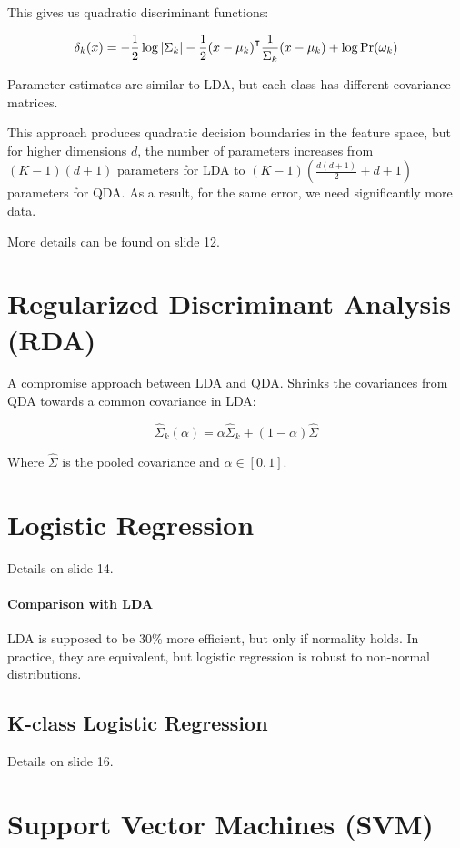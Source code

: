 \documentclass{idc_msc}
\renewcommand{\T}{{\mathpalette\raiseT\intercal}} %
\begin{document}
This gives us quadratic discriminant functions:

\[\delta_k(x) = - \frac{1}{2} \log |\Sigma_k| - \frac{1}{2}(x - \mu_k)^\T \frac{1}{\Sigma_k}(x- \mu_k) + \log \Pr(\omega_k) \]

Parameter estimates are similar to LDA, but each class has different covariance matrices.

This approach produces quadratic decision boundaries in the feature space, but for higher dimensions \(d\), the number of parameters increases from \((K-1)(d+1)\) parameters for LDA to \((K-1)(\frac{d(d+1)}{2}+d + 1)\) parameters for QDA.
As a result, for the same error, we need significantly more data.

More details can be found on slide 12.

\section{Regularized Discriminant Analysis (RDA)}

A compromise approach between LDA and QDA.
Shrinks the covariances from QDA towards a common covariance in LDA:

\[\widehat{\Sigma}_k(\alpha) = \alpha\widehat{\Sigma}_k + (1 - \alpha)\widehat{\Sigma}\]

Where \(\widehat{\Sigma}\) is the pooled covariance and \(\alpha \in [0,1]\).

\section{Logistic Regression}

Details on slide 14.

\paragraph{Comparison with LDA}

LDA is supposed to be 30\% more efficient, but only if normality holds. In practice, they are equivalent, but logistic regression is robust to non-normal distributions.

\subsection{K-class Logistic Regression}

Details on slide 16.

\section{Support Vector Machines (SVM)}
\end{document}
